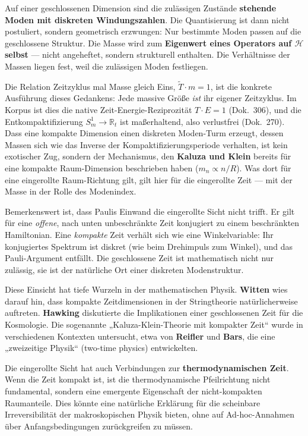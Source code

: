 Auf einer geschlossenen Dimension sind die zulässigen Zustände \textbf{stehende Moden mit diskreten Windungszahlen}. Die Quantisierung ist dann nicht postuliert, sondern geometrisch erzwungen: Nur bestimmte Moden passen auf die geschlossene Struktur. Die Masse wird zum \textbf{Eigenwert eines Operators auf $\mathcal{H}$ selbst} --- nicht angeheftet, sondern strukturell enthalten. Die Verhältnisse der Massen liegen fest, weil die zulässigen Moden festliegen.

Die Relation Zeitzyklus mal Masse gleich Eins, $\tilde{T}\cdot m = 1$, ist die konkrete Ausführung dieses Gedankens: Jede massive Größe \emph{ist} ihr eigener Zeitzyklus. Im Korpus ist dies die native Zeit-Energie-Reziprozität $T\cdot E = 1$ (Dok.~306), und die Entkompaktifizierung $S^1_m\to\mathbb{R}_t$ ist maßerhaltend, also verlustfrei (Dok.~270). Dass eine kompakte Dimension einen diskreten Moden-Turm erzeugt, dessen Massen sich wie das Inverse der Kompaktifizierungsperiode verhalten, ist kein exotischer Zug, sondern der Mechanismus, den \textbf{Kaluza und Klein} bereits für eine kompakte Raum-Dimension beschrieben haben ($m_n \propto n/R$). Was dort für eine eingerollte Raum-Richtung gilt, gilt hier für die eingerollte Zeit --- mit der Masse in der Rolle des Modenindex.

Bemerkenswert ist, dass Paulis Einwand die eingerollte Sicht nicht trifft. Er gilt für eine \emph{offene}, nach unten unbeschränkte Zeit konjugiert zu einem beschränkten Hamiltonian. Eine \emph{kompakte} Zeit verhält sich wie eine Winkelvariable: Ihr konjugiertes Spektrum ist diskret (wie beim Drehimpuls zum Winkel), und das Pauli-Argument entfällt. Die geschlossene Zeit ist mathematisch nicht nur zulässig, sie ist der natürliche Ort einer diskreten Modenstruktur.

Diese Einsicht hat tiefe Wurzeln in der mathematischen Physik. \textbf{Witten} wies darauf hin, dass kompakte Zeitdimensionen in der Stringtheorie natürlicherweise auftreten. \textbf{Hawking} diskutierte die Implikationen einer geschlossenen Zeit für die Kosmologie. Die sogenannte „Kaluza-Klein-Theorie mit kompakter Zeit`` wurde in verschiedenen Kontexten untersucht, etwa von \textbf{Reifler} und \textbf{Bars}, die eine „zweizeitige Physik`` (two-time physics) entwickelten.

Die eingerollte Sicht hat auch Verbindungen zur \textbf{thermodynamischen Zeit}. Wenn die Zeit kompakt ist, ist die thermodynamische Pfeilrichtung nicht fundamental, sondern eine emergente Eigenschaft der nicht-kompakten Raumanteile. Dies könnte eine natürliche Erklärung für die scheinbare Irreversibilität der makroskopischen Physik bieten, ohne auf Ad-hoc-Annahmen über Anfangsbedingungen zurückgreifen zu müssen.

